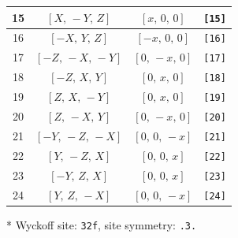 \documentclass[fleqn,8pt]{jsarticle}
\begin{document}
\begin{longtable}{cccc}
15 & $\left[ X,\, - Y,\, Z \right]$ & $\left[ x,\, 0,\, 0 \right]$ & {\tt [15]} \\ \hline
16 & $\left[ - X,\, Y,\, Z \right]$ & $\left[ - x,\, 0,\, 0 \right]$ & {\tt [16]} \\ \hline
17 & $\left[ - Z,\, - X,\, - Y \right]$ & $\left[ 0,\, - x,\, 0 \right]$ & {\tt [17]} \\ \hline
18 & $\left[ - Z,\, X,\, Y \right]$ & $\left[ 0,\, x,\, 0 \right]$ & {\tt [18]} \\ \hline
19 & $\left[ Z,\, X,\, - Y \right]$ & $\left[ 0,\, x,\, 0 \right]$ & {\tt [19]} \\ \hline
20 & $\left[ Z,\, - X,\, Y \right]$ & $\left[ 0,\, - x,\, 0 \right]$ & {\tt [20]} \\ \hline
21 & $\left[ - Y,\, - Z,\, - X \right]$ & $\left[ 0,\, 0,\, - x \right]$ & {\tt [21]} \\ \hline
22 & $\left[ Y,\, - Z,\, X \right]$ & $\left[ 0,\, 0,\, x \right]$ & {\tt [22]} \\ \hline
23 & $\left[ - Y,\, Z,\, X \right]$ & $\left[ 0,\, 0,\, x \right]$ & {\tt [23]} \\ \hline
24 & $\left[ Y,\, Z,\, - X \right]$ & $\left[ 0,\, 0,\, - x \right]$ & {\tt [24]} \\
\end{longtable}
* Wyckoff site: {\tt 32f}, site symmetry: {\tt .3.}
\renewcommand{\arraystretch}{1.2}
\end{document}

